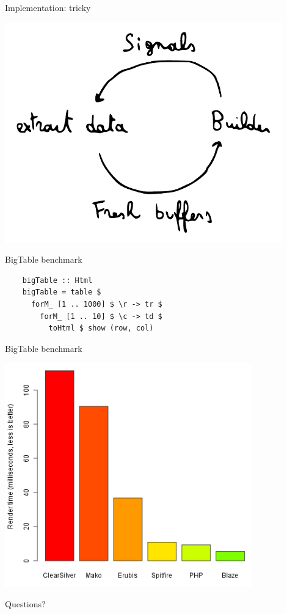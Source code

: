 \documentclass[20pt]{beamer}
\newcommand{\vspaced}{
    \vspace{5mm}
}
\begin{document}
\begin{frame}{Implementation: tricky}
    \begin{center}
    \includegraphics[width=0.9\textwidth]{images/builder.pdf}
    \end{center}
\end{frame}

\begin{frame}[fragile, b]{BigTable benchmark}
    \begin{lstlisting}
    bigTable :: Html
    bigTable = table $
      forM_ [1 .. 1000] $ \r -> tr $
        forM_ [1 .. 10] $ \c -> td $
          toHtml $ show (row, col)
    \end{lstlisting}
    \vspaced
\end{frame}

\begin{frame}{BigTable benchmark}
    \begin{center}
    \includegraphics[width=0.8\textwidth]{images/benchmarks.png}
    \end{center}
\end{frame}

\begin{frame}{Questions?}

\end{frame}
\end{document}
